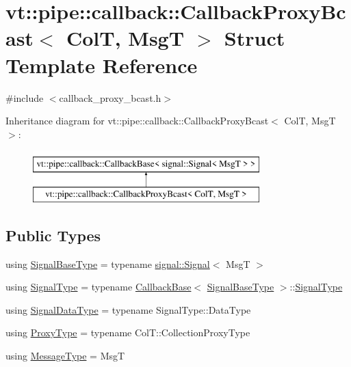 \hypertarget{structvt_1_1pipe_1_1callback_1_1_callback_proxy_bcast}{}\section{vt\+:\+:pipe\+:\+:callback\+:\+:Callback\+Proxy\+Bcast$<$ ColT, MsgT $>$ Struct Template Reference}
\label{structvt_1_1pipe_1_1callback_1_1_callback_proxy_bcast}


{\ttfamily \#include $<$callback\+\_\+proxy\+\_\+bcast.\+h$>$}

Inheritance diagram for vt\+:\+:pipe\+:\+:callback\+:\+:Callback\+Proxy\+Bcast$<$ ColT, MsgT $>$\+:\begin{figure}[H]
\begin{center}
\leavevmode
\includegraphics[height=2.000000cm]{structvt_1_1pipe_1_1callback_1_1_callback_proxy_bcast}
\end{center}
\end{figure}
\subsection*{Public Types}
\begin{DoxyCompactItemize}
\item 
using \hyperlink{structvt_1_1pipe_1_1callback_1_1_callback_proxy_bcast_a4ed994346a98d36d5d70c07a3d1e1dfb}{Signal\+Base\+Type} = typename \hyperlink{structvt_1_1pipe_1_1signal_1_1_signal}{signal\+::\+Signal}$<$ MsgT $>$
\item 
using \hyperlink{structvt_1_1pipe_1_1callback_1_1_callback_proxy_bcast_a152bf72e620b884defce792be43860d2}{Signal\+Type} = typename \hyperlink{structvt_1_1pipe_1_1callback_1_1_callback_base}{Callback\+Base}$<$ \hyperlink{structvt_1_1pipe_1_1callback_1_1_callback_proxy_bcast_a4ed994346a98d36d5d70c07a3d1e1dfb}{Signal\+Base\+Type} $>$\+::\hyperlink{structvt_1_1pipe_1_1callback_1_1_callback_proxy_bcast_a152bf72e620b884defce792be43860d2}{Signal\+Type}
\item 
using \hyperlink{structvt_1_1pipe_1_1callback_1_1_callback_proxy_bcast_ae26574a2b9198a4b4e427bbaab76de53}{Signal\+Data\+Type} = typename Signal\+Type\+::\+Data\+Type
\item 
using \hyperlink{structvt_1_1pipe_1_1callback_1_1_callback_proxy_bcast_a27c62cb9cbd1dcd3f135dcd98d98c991}{Proxy\+Type} = typename Col\+T\+::\+Collection\+Proxy\+Type
\item 
using \hyperlink{structvt_1_1pipe_1_1callback_1_1_callback_proxy_bcast_ad65703bd011d36432495be4451ea61e7}{Message\+Type} = MsgT
\end{DoxyCompactItemize}
